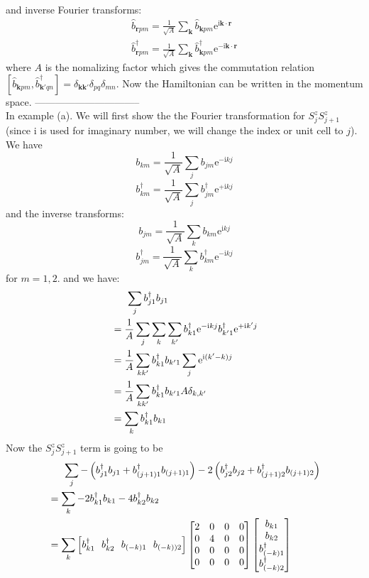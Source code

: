 \documentclass[letter]{article}
\newcommand{\e}{\mathrm{e}}
\newcommand{\ii}{\mathrm{i}}
\begin{document}
and inverse Fourier transforms:
$$ \begin{aligned}
    \hat{b}_{\bm{r}pm}=\frac{1}{\sqrt{A}}\sum_{\bm{k}}\hat{b}_{\bm{k}pm}\e^{\ii\bm{k}\cdot\bm{r}} \\
    \hat{b}_{\bm{r}pm}^{\dagger}=\frac{1}{\sqrt{A}}\sum_{\bm{k}}\hat{b}_{\bm{k}pm}^{\dagger}\e^{-\ii\bm{k}\cdot\bm{r}}
    \end{aligned} $$
where $A$ is the nomalizing factor which gives the commutation relation $\left[\hat{b}_{\bm{k}pm},\hat{b}_{\bm{k'}qn}^{\dagger}\right]=\delta_{\bm{k}\bm{k}'}\delta_{pq}\delta_{mn}$. Now the Hamiltonian can be written in the momentum space.
--------------------------------\\
In example (a). 
We will first show the the Fourier transformation for $S_j^z S_{j+1}^z$(since i is used for imaginary number, we will change the index or unit cell to $j$).
We have $$
b_{km}=\frac{1}{\sqrt{A}}\sum_{j}b_{jm}\e^{-\ii k j}
$$$$
b^{\dagger}_{km}=\frac{1}{\sqrt{A}}\sum_{j}b_{jm}^{\dagger}\e^{+\ii k j}
$$
and the inverse transforms:$$
b_{jm}=\frac{1}{\sqrt{A}}\sum_{k}b_{km}\e^{\ii k j}
$$$$
b^{\dagger}_{jm}=\frac{1}{\sqrt{A}}\sum_{k}b_{km}^{\dagger}\e^{-\ii k j}
$$
for $m=1,2$. and we have:
$$\begin{aligned}
&\indent \sum_j b_{j1}^{\dagger}b_{j1} \\
&=\frac{1}{A}\sum_{j}\sum_{k}\sum_{k'}b_{k1}^{\dagger}\e^{-\ii kj}b_{k'1}^{\dagger}\e^{+\ii k'j}\\
&=\frac{1}{A}\sum_{kk'}b_{k1}^{\dagger}b_{k'1}\sum_{j}\e^{\ii(k'-k)j}\\
&=\frac{1}{A}\sum_{kk'}b_{k1}^{\dagger}b_{k'1} A \delta_{k,k'}\\
&=\sum_{k}b_{k1}^{\dagger}b_{k1}
\end{aligned}
$$
Now the $S_j^z S_{j+1}^z$ term is going to be$$\begin{aligned}
& \indent \sum_j -\left(b_{j1}^{\dagger}b_{j1}+b_{(j+1)1}^{\dagger}b_{(j+1)1}\right)-2\left(b_{j2}^{\dagger}b_{j2}+b_{(j+1)2}^{\dagger}b_{(j+1)2}\right)\\
&= \sum_{k}-2b_{k1}^{\dagger}b_{k1}-4b_{k2}^{\dagger}b_{k2}\\
&=\sum_k \left[
    b_{k1}^{\dagger} \ \ 
    b_{k2}^{\dagger}\  \ 
    b_{(-k)1}\ \ 
    b_{(-k))2}\right]
   \begin{bmatrix}
        2 & 0 & 0 & 0 \\
       0 &  4 & 0 &0 \\
       0 &  0 & 0 &0\\
        0 & 0 & 0& 0
        \end{bmatrix}\begin{bmatrix}
            b_{k1}  \\
            b_{k2}  \\
            b_{(-k)1}^{\dagger}\\
            b_{(-k)2}^{\dagger}
            \end{bmatrix}
\end{aligned}
$$
\end{document}
